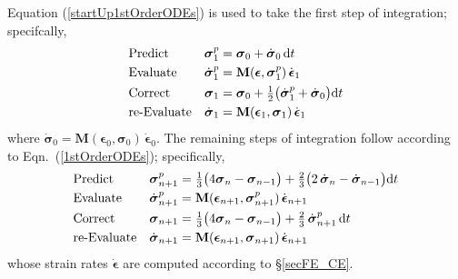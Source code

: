 Equation (\ref{startUp1stOrderODEs}) is used to take the first step of integration; specifcally, 
\begin{subequations}
    \notag
    \begin{align}
    \mbox{} & \text{Predict} & 
    \boldsymbol{\sigma}_1^p & = \boldsymbol{\sigma}_0 + \dot{\boldsymbol{\sigma}}_0 \, \mathrm{d}t \\
    \mbox{} & \text{Evaluate} & 
    \dot{\boldsymbol{\sigma}}^p_1 & = \mathbf{M} ( \boldsymbol{\epsilon} , \boldsymbol{\sigma}_1^p ) \, \dot{\boldsymbol{\epsilon}}_1 \\
    \mbox{} & \text{Correct} &
    \boldsymbol{\sigma}_1 & = \boldsymbol{\sigma}_0 + \tfrac{1}{2} 
    \bigl( \dot{\boldsymbol{\sigma}}_1^p + 
    \dot{\boldsymbol{\sigma}}_0 \bigr) \mathrm{d} t \\
    \mbox{} & \text{re-Evaluate} & 
    \dot{\boldsymbol{\sigma}}_1 & = \mathbf{M} ( \boldsymbol{\epsilon}_1 , \boldsymbol{\sigma}_1 ) \, \dot{\boldsymbol{\epsilon}}_1
    \end{align}
\end{subequations}
where $\dot{\boldsymbol{\sigma}}_0 = \mathbf{M} ( \boldsymbol{\epsilon}_0 , \boldsymbol{\sigma}_0 ) \, \dot{\boldsymbol{\epsilon}}_0$.  The remaining steps of integration follow according to Eqn.~(\ref{1stOrderODEs}); specifically,
\begin{subequations}
    \notag
    \begin{align}
    \mbox{} & \text{Predict} & 
    \boldsymbol{\sigma}_{n+1}^p & = \tfrac{1}{3} 
    \bigl( 4 \boldsymbol{\sigma}_n - \boldsymbol{\sigma}_{n-1} \bigr) + 
    \tfrac{2}{3} \bigl( 2 \, \dot{\boldsymbol{\sigma}}_n - 
    \dot{\boldsymbol{\sigma}}_{n-1} \bigr) \mathrm{d} t \\
    \mbox{} & \text{Evaluate} & 
    \dot{\boldsymbol{\sigma}}^p_{n+1} & = \mathbf{M} ( \boldsymbol{\epsilon}_{n+1} , \boldsymbol{\sigma}_{n+1}^p ) \, \dot{\boldsymbol{\epsilon}}_{n+1} \\
    \mbox{} & \text{Correct} &
    \boldsymbol{\sigma}_{n+1} & = \tfrac{1}{3} 
    \bigl( 4 \boldsymbol{\sigma}_n - \boldsymbol{\sigma}_{n-1} \bigr) + 
    \tfrac{2}{3} \, \dot{\boldsymbol{\sigma}}^{p}_{n+1} \, \mathrm{d}t \\
    \mbox{} & \text{re-Evaluate} & 
    \dot{\boldsymbol{\sigma}}_{n+1} & = \mathbf{M} ( \boldsymbol{\epsilon}_{n+1} , 
    \boldsymbol{\sigma}_{n+1} ) \, \dot{\boldsymbol{\epsilon}}_{n+1}
    \end{align}
\end{subequations} 
whose strain rates $\dot{\boldsymbol{\epsilon}}$ are computed according to \S\ref{secFE_CE}.


